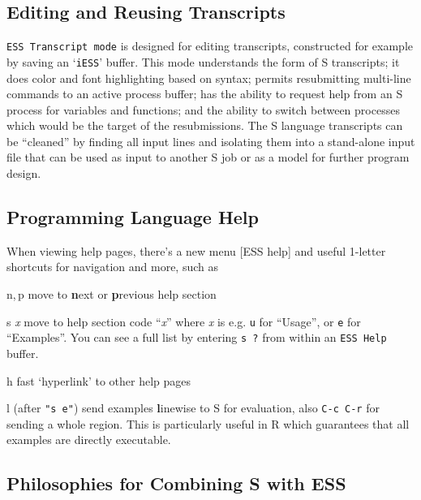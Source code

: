 \documentclass{article}
\newcommand{\stexttt}[1]{{\small\texttt{#1}}}
\newcommand{\file}[1]{`\stexttt{#1}'}
\begin{document}
\subsection{Editing and Reusing Transcripts}
\label{sec:S:trans}

\stexttt{ESS Transcript mode} is designed for editing transcripts,
constructed for example by saving an \file{iESS} buffer.  This mode
understands the form of S transcripts; it does color and font
highlighting based on syntax; permits resubmitting multi-line commands
to an active process buffer; has the ability to request help from an S
process for variables and functions; and the ability to switch between
processes which would be the target of the resubmissions.  The S
language transcripts can be ``cleaned'' by finding all input lines and
isolating them into a stand-alone input file that can be used as input
to another S job or as a model for further program design.

\subsection{Programming Language Help}
\label{sec:S:help}

When viewing help pages, there's a new menu \textsf{[ESS help]} and
useful 1-letter shortcuts for navigation and more, such as
\begin{list}{}{\renewcommand{\makelabel}[1]{\bf#1\hfill}}
\item[n,\,p] move to \textbf{n}ext or \textbf{p}revious help section
\item[{s \textit{x}}] move to help section code ``\textit{x}'' where
  \textit{x} is e.g. \stexttt{u} for ``Usage'', or \stexttt{e} for
  ``Examples''.  You can see a full list by entering \stexttt{s ?} from within
an \stexttt{ESS Help} buffer.
\item[h] fast `hyperlink' to other help pages
\item[l] (after \stexttt{"s e"}) send examples \textbf{l}inewise to S for
  evaluation, also \stexttt{C-c C-r} for sending a whole region.  This 
  is particularly useful in R which guarantees that all examples are
  directly executable.
\end{list}

\subsection{Philosophies for Combining S with ESS}
\label{sec:S:philosophy}
\end{document}
